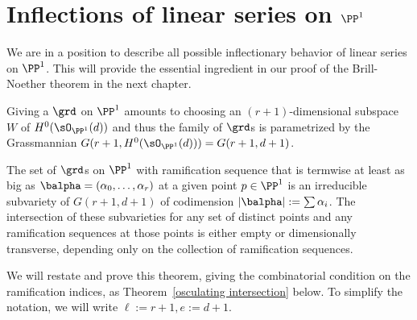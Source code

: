 \section{Inflections of linear series on $\PP^1$}

We are in a position to describe all possible inflectionary behavior of linear series on $\PP^1$. This will provide the essential ingredient in our proof of the Brill-Noether theorem in the next chapter.


Giving a $\grd$ on $\PP^{1}$ amounts to choosing an $(r+1)$-dimensional subspace $W$ of  $H^{0}(\sO_{\PP^{1}}(d))$ and thus the family of $\grd$s is parametrized by the
Grassmannian $G(r+1, H^{0}(\sO_{\PP^{1}}(d))) = G(r+1, d+1)$.

\goodbreak

\begin{theorem}\label{transversality of ramification}
The set of $\grd$s on $\PP^{1}$  with ramification sequence that is termwise at least as big as $\balpha = (\alpha_{0}, \dots, \alpha_{r})$ 
at a
given point $p\in \PP^{1}$
is an irreducible subvariety of $G(r+1,d+1)$ of codimension $|\balpha| := \sum \alpha_{i}$. The intersection
of these subvarieties for any set of distinct points and any ramification sequences at those points
is either empty or dimensionally transverse, depending only on the collection of ramification sequences.
\end{theorem}

We will restate and prove this theorem, giving the combinatorial condition on the ramification indices,
as Theorem~\ref{osculating intersection} below. To simplify the notation, we will write $\ell := r+1, e:= d+1$. 


